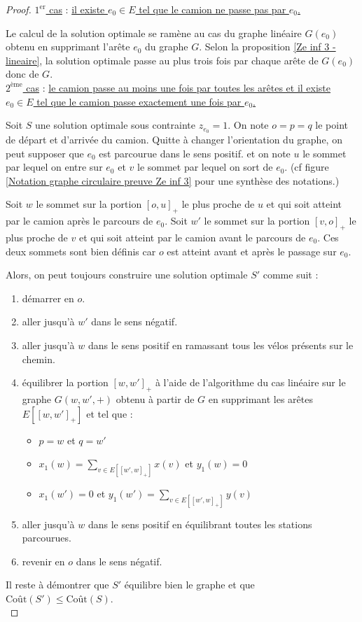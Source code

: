\begin{proof}\uline{$1^{\mbox{er}}$ cas} : \uline{il existe $e_0 \in E$ tel que le camion ne passe pas par $e_0$.}

Le calcul de la solution optimale se ramène au cas du graphe linéaire $G(e_0)$ obtenu en supprimant l'arête $e_0$ du graphe $G$. Selon la proposition \ref{Ze inf 3 - lineaire}, la solution optimale passe au plus trois fois par chaque arête de $G(e_0)$ donc de $G$.
\\

\uline{$2^{\mbox{ème}}$ cas} : \uline{le camion passe au moins une fois par toutes les arêtes et il existe $e_0 \in E$ tel que le camion passe exactement une fois par $e_0$.}

Soit $S$ une solution optimale sous contrainte $z_{e_0} = 1$. On note $o=p=q$ le point de départ et d'arrivée du camion. Quitte à changer l'orientation du graphe, on peut supposer que $e_0$ est parcourue dans le sens positif. et on note $u$ le sommet par lequel on entre sur $e_0$ et $v$ le sommet par lequel on sort de $e_0$. (cf figure \ref{Notation graphe circulaire preuve Ze inf 3} pour une synthèse des notations.)

Soit $w$ le sommet sur la portion $[o,u]_+$ le plus proche de $u$ et qui soit atteint par le camion après le parcours de $e_0$. Soit $w'$ le sommet sur la portion $[v,o]_+$ le plus proche de $v$ et qui soit atteint par le camion avant le parcours de $e_0$. Ces deux sommets sont bien définis car $o$ est atteint avant et après le passage sur $e_0$.

Alors, on peut toujours construire une solution optimale $S'$ comme suit :
\begin{enumerate}
\item\label{NewS1} démarrer en $o$.
\item\label{NewS2} aller jusqu'à $w'$ dans le sens négatif.
\item\label{NewS3} aller jusqu'à $w$ dans le sens positif en ramassant tous les vélos présents sur le chemin.
\item\label{NewS4} équilibrer la portion $[w,w']_+$ à l'aide de l'algorithme du cas linéaire sur le graphe $G(w,w',+)$ obtenu à partir de $G$ en supprimant les arêtes $E\left[[w,w']_+\right]$ et tel que :
  \begin{itemize}
  \item $p=w$ et $q=w'$
  \item $\displaystyle x_1(w) = \sum_{v \in E\left[ \left[w',w\right]_+ \right]} x(v)$ et $y_1(w) = 0$
  \item $x_1(w') = 0$ et $\displaystyle y_1(w') = \sum_{v \in E\left[ \left[w',w\right]_+ \right]} y(v)$
  \end{itemize}
\item\label{NewS5} aller jusqu'à $w$ dans le sens positif en équilibrant toutes les stations parcourues.
\item\label{NewS6} revenir en $o$ dans le sens négatif.
\end{enumerate}
Il reste à démontrer que $S'$ équilibre bien le graphe et que $\mbox{Coût}(S') \le \mbox{Coût}(S)$.
\\


\end{proof}
